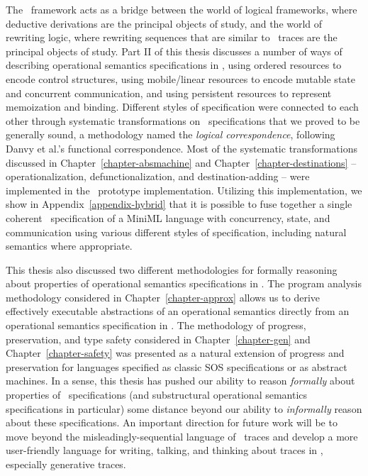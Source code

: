 The \sls~framework acts as a bridge between the world of logical
frameworks, where deductive derivations are the principal objects of
study, and the world of rewriting logic, where rewriting sequences
that are similar to \sls~traces are the principal objects of
study. Part II of this thesis discusses a number of ways of describing
operational semantics specifications in \sls, using ordered resources
to encode control structures, using mobile/linear resources to encode
mutable state and concurrent communication, and using persistent
resources to represent memoization and binding. Different styles of
specification were connected to each other through systematic
transformations on \sls~specifications that we proved to be generally
sound, a methodology named the {\it logical correspondence}, following
Danvy et al.'s functional correspondence. Most of the systematic
transformations discussed in Chapter~\ref{chapter-absmachine} and
Chapter~\ref{chapter-destinations} -- operationalization,
defunctionalization, and destination-adding -- were implemented in the
\sls~prototype implementation. Utilizing this implementation, we show
in Appendix~\ref{appendix-hybrid} that it is possible to fuse together
a single coherent \sls~specification of a MiniML language with
concurrency, state, and communication using various different styles
of specification, including natural semantics where appropriate.


This thesis also discussed two different methodologies for formally
reasoning about properties of operational semantics specifications in
\sls. The program analysis methodology considered in
Chapter~\ref{chapter-approx} allows us to derive effectively
executable abstractions of an operational semantics directly from an
operational semantics specification in \sls. The methodology of
progress, preservation, and type safety considered in
Chapter~\ref{chapter-gen} and Chapter~\ref{chapter-safety} was
presented as a natural extension of progress and preservation for
languages specified as classic SOS specifications or as abstract
machines. In a sense, this thesis has pushed our ability to reason
{\it formally} about properties of \sls~specifications (and
substructural operational semantics specifications in particular) some
distance beyond our ability to {\it informally} reason about these
specifications. An important direction for future work will be to move
beyond the misleadingly-sequential language of \sls~traces and
develop a more user-friendly language for writing, talking, and
thinking about traces in \sls, especially generative traces.
